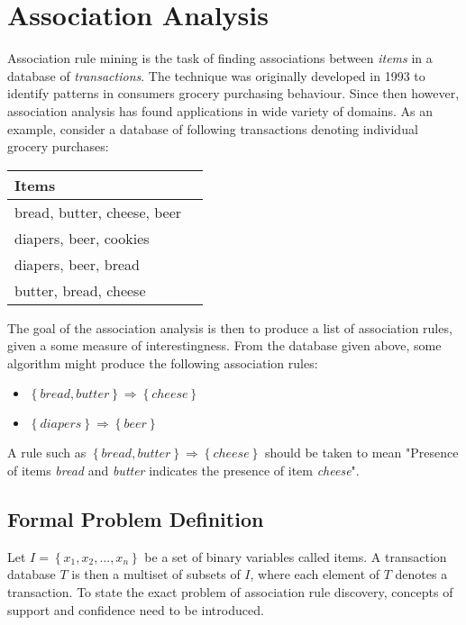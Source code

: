 \section{Association Analysis}

Association rule mining is the task of finding associations between \textit{items} in a database of \textit{transactions}. The technique was originally developed in 1993 to identify patterns in consumers grocery purchasing behaviour. Since then however, association analysis has found applications in wide variety of domains. As an example, consider a database of following transactions denoting individual grocery purchases:
 
\begin{center}
    \begin{tabular}{ | l | l | }
    \hline
    \textbf{Items} \\ \hline
    bread, butter, cheese, beer \\ \hline 
    diapers, beer, cookies \\ \hline 
    diapers, beer, bread \\ \hline 
    butter, bread, cheese \\ \hline 
    \end{tabular}
\end{center} 
 
The goal of the association analysis is then to produce a list of association rules, given a some measure of interestingness. From the database given above, some algorithm might produce the following association rules: 

\begin{itemize}
	\item $\left\{ bread, butter \right\} \Rightarrow \left\{ cheese \right\}$	
	\item $\left\{ diapers \right\} \Rightarrow \left\{ beer \right\}$	
\end{itemize} 

A rule such as $\left\{ bread, butter \right\} \Rightarrow \left\{ cheese \right\}$	should be taken to mean "Presence of items \textit{bread} and \textit{butter} indicates the presence of item \textit{cheese}".

\subsection{Formal Problem Definition}

Let $I = \left\{ x_1, x_2, ..., x_n \right\}$ be a set of binary variables called items. A transaction database $T$ is then a multiset of subsets of $I$, where each element of $T$ denotes a transaction. To state the exact problem of association rule discovery, concepts of support and confidence need to be introduced.

